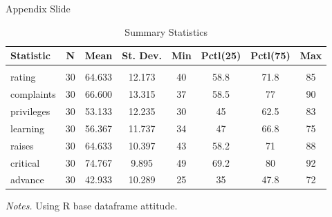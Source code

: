 \documentclass[aspectratio=169]{beamer}
\begin{document}
\begin{frame}{Appendix Slide}\label{appendix1}
\begin{table}
    \caption{Summary Statistics}
    \label{appendix_summ_stat}
    \begin{adjustbox}{max width = \textwidth, width = 0.7\textwidth, center}
        \begin{threeparttable}
            \begin{tabular}{@{} lccccccc @{}} 
                \toprule
                Statistic & \multicolumn{1}{c}{N} & \multicolumn{1}{c}{Mean} & \multicolumn{1}{c}{St. Dev.} & \multicolumn{1}{c}{Min} & \multicolumn{1}{c}{Pctl(25)} & \multicolumn{1}{c}{Pctl(75)} & \multicolumn{1}{c}{Max} \\ 
                \hline \\[-1.8ex] 
                rating & 30 & 64.633 & 12.173 & 40 & 58.8 & 71.8 & 85 \\ 
                complaints & 30 & 66.600 & 13.315 & 37 & 58.5 & 77 & 90 \\ 
                privileges & 30 & 53.133 & 12.235 & 30 & 45 & 62.5 & 83 \\ 
                learning & 30 & 56.367 & 11.737 & 34 & 47 & 66.8 & 75 \\ 
                raises & 30 & 64.633 & 10.397 & 43 & 58.2 & 71 & 88 \\ 
                critical & 30 & 74.767 & 9.895 & 49 & 69.2 & 80 & 92 \\ 
                advance & 30 & 42.933 & 10.289 & 25 & 35 & 47.8 & 72 \\ 
                \bottomrule
            \end{tabular} 
            \begin{tablenotes}
                \item \textit{Notes.} Using R base dataframe attitude.
            \end{tablenotes}
        \end{threeparttable}
    \end{adjustbox}
\end{table}
    
    \hyperlink{main1}{}
\end{frame}
\end{document}
